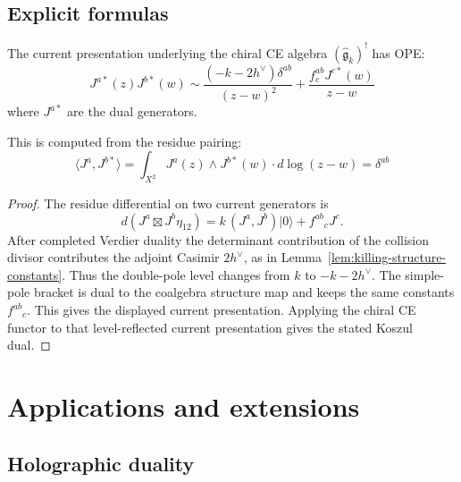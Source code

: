 \subsection{Explicit formulas}

\begin{theorem}
\label{thm:closed-form-ope}
The current presentation underlying the chiral CE algebra
$(\widehat{\mathfrak{g}}_k)^!$ has OPE:
\begin{equation}
J^{a*}(z) J^{b*}(w) \sim \frac{(-k-2h^\vee) \delta^{ab}}{(z-w)^2} + \frac{f^{ab}_c J^{c*}(w)}{z-w}
\end{equation}
where $J^{a*}$ are the dual generators.

This is computed from the residue pairing:
\begin{equation}
\langle J^a, J^{b*} \rangle = \int_{X^2} J^a(z) \wedge J^{b*}(w) \cdot d\log(z-w) = \delta^{ab}
\end{equation}
\end{theorem}
\begin{proof}
The residue differential on two current generators is
\[
d(J^a\boxtimes J^b\eta_{12})
= k\,(J^a,J^b)|0\rangle + f^{ab}{}_cJ^c .
\]
After completed Verdier duality the determinant contribution of the
collision divisor contributes the adjoint Casimir
\(2h^\vee\), as in Lemma~\ref{lem:killing-structure-constants}.
Thus the double-pole level changes from \(k\) to
\(-k-2h^\vee\).  The simple-pole bracket is dual to the coalgebra
structure map and keeps the same constants \(f^{ab}{}_c\).  This gives
the displayed current presentation.  Applying the chiral CE functor to
that level-reflected current presentation gives the stated Koszul dual.
\end{proof}

\section{Applications and extensions}

\subsection{Holographic duality}

